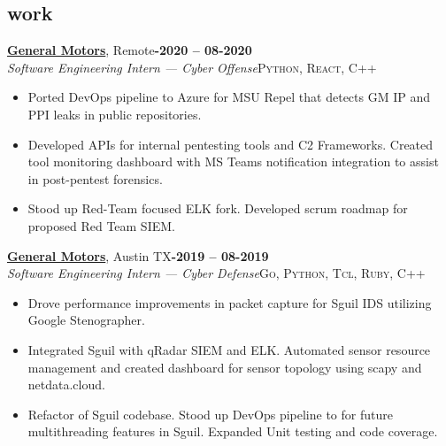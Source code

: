 \documentclass[margin,10pt]{res}
\begin{document}
\begin{resume}
\section{\sc \lsstyle work}
    \href{https://www.gm.com/}{\textbf{General Motors}}, Remote\hfill \textsc{\bfseries{}-2020 -- 08-2020}\\
    \textit{Software Engineering Intern --- Cyber Offense}\hfill \textsc{Python, React, C++}
    \vspace{0.5em}
    \begin{itemize}
        \item Ported DevOps pipeline to Azure for MSU Repel that detects GM IP and PPI leaks in public repositories.
        \item Developed APIs for internal pentesting tools and C2 Frameworks. Created tool monitoring dashboard with MS Teams notification integration to assist in post-pentest forensics. 
        \item Stood up Red-Team focused ELK fork. Developed scrum roadmap for proposed Red Team SIEM.
    \end{itemize}

    \href{https://www.gm.com/}{\textbf{General Motors}}, Austin TX\hfill \textsc{\bfseries{}-2019 -- 08-2019}\\
    \textit{Software Engineering Intern --- Cyber Defense}\hfill \textsc{Go, Python, Tcl, Ruby, C++}
    \vspace{0.5em}
    \begin{itemize}
        \item Drove performance improvements in packet capture for Sguil IDS utilizing Google Stenographer. 
        \item Integrated Sguil with qRadar SIEM and ELK. Automated sensor resource management and created dashboard for sensor topology using scapy and netdata.cloud.
        \item Refactor of Sguil codebase. Stood up DevOps pipeline to for future multithreading features in Sguil. Expanded Unit testing and code coverage.
    \end{itemize}


\end{resume}
\end{document}
